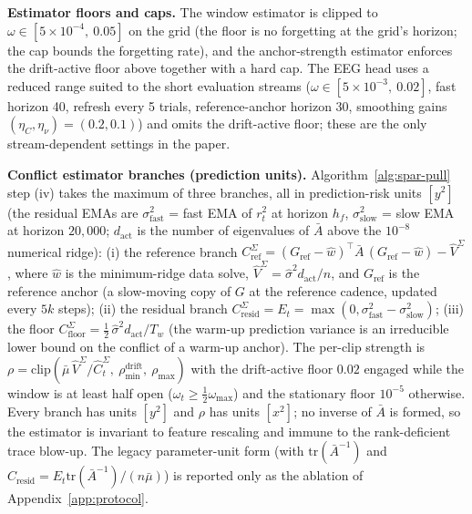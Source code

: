 \textbf{Estimator floors and caps.}
The window estimator is clipped to $\omega \in [5 \times 10^{-4},\ 0.05]$ on the grid (the floor is no forgetting at the grid's horizon; the cap bounds the forgetting rate), and the anchor-strength estimator enforces the drift-active floor above together with a hard cap.
The EEG head uses a reduced range suited to the short evaluation streams ($\omega \in [5 \times 10^{-3},\ 0.02]$, fast horizon 40, refresh every 5 trials, reference-anchor horizon 30, smoothing gains $(\eta_C,\eta_\nu) = (0.2, 0.1)$) and omits the drift-active floor; these are the only stream-dependent settings in the paper.

\textbf{Conflict estimator branches (prediction units).}
Algorithm~\ref{alg:spar-pull} step (iv) takes the maximum of three branches, all in prediction-risk units $[y^2]$ (the residual EMAs are $\sigma^2_{\mathrm{fast}}$ = fast EMA of $r_t^2$ at horizon $h_f$, $\sigma^2_{\mathrm{slow}}$ = slow EMA at horizon $20{,}000$; $d_{\mathrm{act}}$ is the number of eigenvalues of $\bar A$ above the $10^{-8}$ numerical ridge):
(i) the reference branch $C^\Sigma_{\mathrm{ref}} = (G_{\mathrm{ref}} - \widehat w)^\top \bar A\,(G_{\mathrm{ref}} - \widehat w) - \widehat V^\Sigma$, where $\widehat w$ is the minimum-ridge data solve, $\widehat V^\Sigma = \hat\sigma^2 d_{\mathrm{act}}/n$, and $G_{\mathrm{ref}}$ is the reference anchor (a slow-moving copy of $G$ at the reference cadence, updated every $5k$ steps);
(ii) the residual branch $C^\Sigma_{\mathrm{resid}} = E_t = \max(0, \sigma^2_{\mathrm{fast}} - \sigma^2_{\mathrm{slow}})$;
(iii) the floor $C^\Sigma_{\mathrm{floor}} = \tfrac12\,\hat\sigma^2 d_{\mathrm{act}}/T_w$ (the warm-up prediction variance is an irreducible lower bound on the conflict of a warm-up anchor).
The per-clip strength is $\rho = \mathrm{clip}(\bar\mu\,\widehat V^\Sigma/\widehat C^\Sigma_t,\ \rho_{\min}^{\mathrm{drift}},\ \rho_{\max})$ with the drift-active floor $0.02$ engaged while the window is at least half open ($\omega_t \ge \tfrac12\omega_{\max}$) and the stationary floor $10^{-5}$ otherwise.
Every branch has units $[y^2]$ and $\rho$ has units $[x^2]$; no inverse of $\bar A$ is formed, so the estimator is invariant to feature rescaling and immune to the rank-deficient trace blow-up.
The legacy parameter-unit form (with $\mathrm{tr}(\bar A^{-1})$ and $C_{\mathrm{resid}}=E_t\mathrm{tr}(\bar A^{-1})/(n\bar\mu)$) is reported only as the ablation of Appendix~\ref{app:protocol}.

